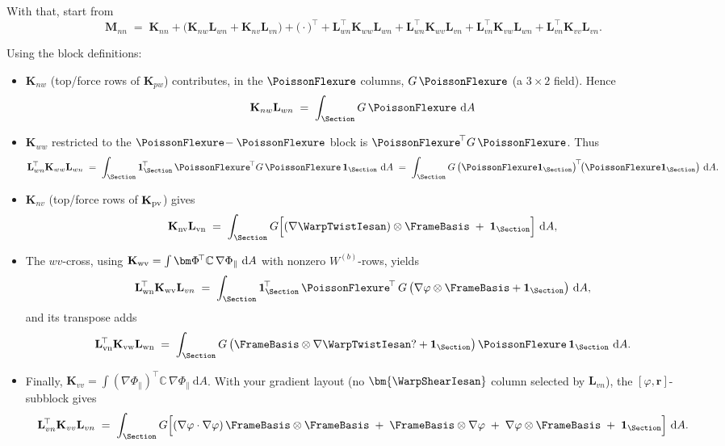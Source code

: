 With that, start from
\[
\mathbf{M}_{nn}\;=\;\mathbf{K}_{nn}
+\big(\mathbf{K}_{nw}\mathbf{L}_{wn}+\mathbf{K}_{nv}\mathbf{L}_{vn}\big)
+\big(\cdot\big)^{\!\top}
+\mathbf{L}_{wn}^{\!\top}\mathbf{K}_{ww}\mathbf{L}_{wn}
+\mathbf{L}_{wn}^{\!\top}\mathbf{K}_{wv}\mathbf{L}_{vn}
+\mathbf{L}_{vn}^{\!\top}\mathbf{K}_{vw}\mathbf{L}_{wn}
+\mathbf{L}_{vn}^{\!\top}\mathbf{K}_{vv}\mathbf{L}_{vn}.
\]

Using the block definitions:
\begin{itemize}
  \item \( \mathbf{K}_{nw}\) (top/force rows of \( \mathbf{K}_{pw}\)) contributes, in the \(\PoissonFlexure\) columns, \(G\,\PoissonFlexure\) (a \(3\times2\) field). Hence
  \[
  \mathbf{K}_{nw}\mathbf{L}_{wn}
  \;=\; \int_{\Section} G\,\PoissonFlexure\mathrm{~d}A
  \]

  \item \( \mathbf{K}_{ww}\) restricted to the \(\PoissonFlexure\!- \PoissonFlexure\) block is \( \PoissonFlexure^{\!\top} G\,\PoissonFlexure\). Thus
  \[
  \mathbf{L}_{wn}^{\!\top}\mathbf{K}_{ww}\mathbf{L}_{wn}
  \;=\;\int_{\Section} \mathbf{1}_{\Section}^{\!\top}\,\PoissonFlexure^{\!\top} G\,\PoissonFlexure\,\mathbf{1}_{\Section}\mathrm{~d}A
  \;=\;\int_{\Section} G\,\big(\PoissonFlexure\mathbf{1}_{\Section}\big)^{\!\top}\!\big(\PoissonFlexure\mathbf{1}_{\Section}\big)\mathrm{~d}A.
  \]

  \item \( \mathbf{K}_{nv}\) (top/force rows of \( \mathbf{K}_{\rm pv}\)) gives
  \[
  \mathbf{K}_{\rm nv}\mathbf{L}_{\rm vn}
  \;=\;\int_{\Section} G\Big[(\nabla\WarpTwistIesan)\otimes\FrameBasis\;+\;\mathbf{1}_{\Section}\Big]\mathrm{~d}A,
  \]

  \item The \(wv\)-cross, using 
  \(\mathbf{K}_{\rm wv}=\int \bm\Phi^{\!\top}\mathbb{C}\,\nabla\Phi_{\parallel}\mathrm{~d}A\)
  with nonzero \(W^{(b)}\)-rows, yields
  \[
  \mathbf{L}_{\rm wn}^{\!\top}\mathbf{K}_{\rm wv}\mathbf{L}_{vn}
  \;=\;\int_{\Section} \mathbf{1}_{\Section}^{\!\top}\,\PoissonFlexure^{\!\top}\,G\,\big(\nabla\varphi\otimes\FrameBasis+\mathbf{1}_{\Section}\big)\mathrm{~d}A,
  \]
  and its transpose adds
  \[
  \mathbf{L}_{\rm vn}^{\!\top}\mathbf{K}_{\rm vw}\mathbf{L}_{\rm wn}
  \;=\;\int_{\Section} G\,\big(\FrameBasis\otimes\nabla\WarpTwistIesan?+\mathbf{1}_{\Section}\big)\,\PoissonFlexure\,\mathbf{1}_{\Section}\mathrm{~d}A.
  \]

  \item Finally, \( \mathbf{K}_{vv}=\int (\nabla\Phi_{\parallel})^{\!\top}\mathbb{C}\,\nabla\Phi_{\parallel}\mathrm{~d}A\).
  With your gradient layout (no \(\bm{\WarpShearIesan}\) column selected by \( \mathbf{L}_{vn}\)), the \([\varphi,\bm{r}]\)-subblock gives
  \[
  \mathbf{L}_{vn}^{\!\top}\mathbf{K}_{vv}\mathbf{L}_{vn}
  \;=\;\int_{\Section} G\Big[
  (\nabla\varphi\cdot\nabla\varphi)\,\FrameBasis\otimes\FrameBasis
  \;+\;\FrameBasis\otimes\nabla\varphi\;+\;\nabla\varphi\otimes\FrameBasis
  \;+\;\mathbf{1}_{\Section}
  \Big]\mathrm{~d}A.
  \]
\end{itemize}

